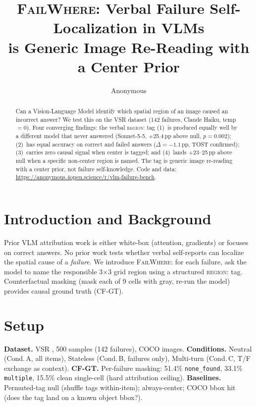 \documentclass[11pt]{article}
\title{\textsc{FailWhere}: Verbal Failure Self-Localization in VLMs\\
is Generic Image Re-Reading with a Center Prior}
\author{Anonymous}
\begin{document}
\maketitle

\begin{abstract}
Can a Vision-Language Model identify which spatial region of an image caused
an incorrect answer?
We test this on the VSR dataset (142 failures, Claude Haiku, temp$=0$).
Four converging findings: the verbal \textsc{region:} tag
(1)~is produced equally well by a different model that never answered
(Sonnet-5-5, $+$25.4\,pp above null, $p{=}0.002$);
(2)~has equal accuracy on correct and failed answers ($\Delta{=}-1.1$\,pp,
TOST confirmed);
(3)~carries zero causal signal when center is tagged; and
(4)~lands $+$23--25\,pp above null when a specific non-center region is named.
The tag is generic image re-reading with a center prior, not failure self-knowledge.
Code and data: \url{https://anonymous.4open.science/r/vlm-failure-bench}.
\end{abstract}

\section{Introduction and Background}

Prior VLM attribution work is either white-box (attention, gradients) or focuses
on correct answers.
No prior work tests whether verbal self-reports can localize the spatial cause of
a \emph{failure}.
We introduce \textsc{FailWhere}: for each failure, ask the model to name the
responsible 3$\times$3 grid region using a structured \textsc{region:} tag.
Counterfactual masking (mask each of 9 cells with gray, re-run the model)
provides causal ground truth (CF-GT).

\section{Setup}

\textbf{Dataset.} VSR \cite{liu-2023-vsr}, 500 samples (142 failures), COCO images.
\textbf{Conditions.} Neutral (Cond.\,A, all items), Stateless (Cond.\,B, failures only),
Multi-turn (Cond.\,C, T/F exchange as context).
\textbf{CF-GT.} Per-failure masking: 51.4\% \texttt{none\_found}, 33.1\% \texttt{multiple},
15.5\% clean single-cell (hard attribution ceiling).
\textbf{Baselines.} Permuted-tag null (shuffle tags within-item); always-center;
COCO bbox hit (does the tag land on a known object bbox?).
\end{document}
